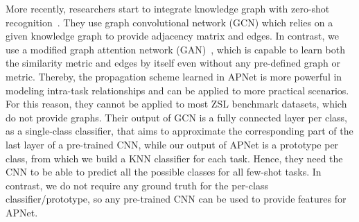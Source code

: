 \documentclass[letterpaper]{article} %
\begin{document}
More recently, researchers start to integrate knowledge graph with zero-shot recognition~\cite{wang2018zero,kampffmeyer2019rethinking}.
They use graph convolutional network (GCN) which relies on a given knowledge graph to provide adjacency matrix and edges. In contrast, we use a modified graph attention network (GAN)~\cite{DBLP:conf/aaai/ShenZLJPZ18,DBLP:conf/naacl/ShenZL0Z19},  which is capable to learn both the similarity metric and edges by itself even without any pre-defined graph or metric.
Thereby, the propagation scheme learned in APNet is more powerful in modeling intra-task relationships and can be applied to more practical scenarios. For this reason, they cannot be applied to most ZSL benchmark datasets, which do not provide graphs.
Their output of GCN is a fully connected layer per class, as a single-class classifier, that aims to approximate the corresponding part of the last layer of a pre-trained CNN, while our output of APNet is a prototype per class, from which we build a KNN classifier for each task. Hence, they need the CNN to be able to predict all the possible classes for all few-shot tasks. In contrast, we do not require any ground truth for the per-class classifier/prototype, so any pre-trained CNN can be used to provide features for APNet.




\end{document}
